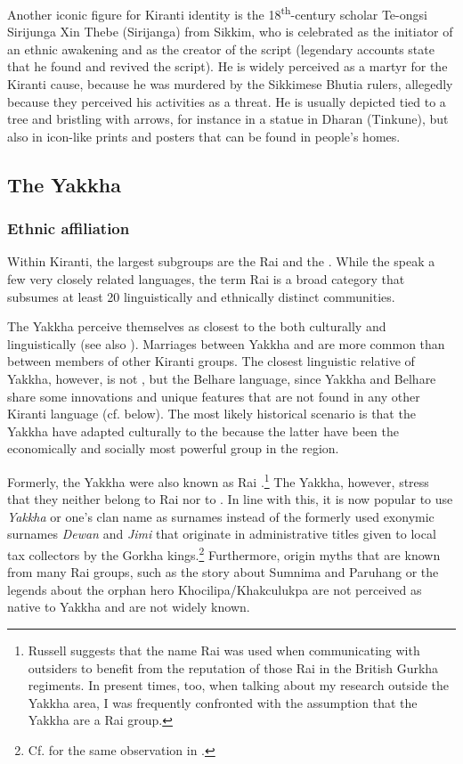 \largerpage
Another iconic figure for Kiranti identity is the 18\textsuperscript{th}-century  scholar Te-ongsi Sirijunga Xin Thebe (Sirijanga) from Sikkim, who is celebrated as the initiator of an ethnic awakening and as the creator of the  script (legendary accounts state that he found and revived the script). He is widely perceived as a martyr for the Kiranti cause, because he was  murdered by the Sikkimese Bhutia rulers, allegedly because they perceived his activities as a threat. He is usually depicted tied to a tree and bristling with arrows, for instance in a statue in Dharan (Tinkune), but also in icon-like prints and posters that can be found in people's homes.


\subsection{The Yakkha}

\subsubsection{Ethnic affiliation}

Within Kiranti, the largest subgroups are the Rai and the . While the  speak a few very closely related languages, the term Rai is a broad category that subsumes at least 20 linguistically and ethnically distinct communities.  

The Yakkha perceive themselves as closest to the  both culturally and linguistically (see also \citet[90]{Russell1992_Yakha}). Marriages between Yakkha and  are more common than between members of other Kiranti groups. The closest linguistic relative of Yakkha, however, is not , but the Belhare language, since Yakkha and Belhare share some innovations and unique features that are not found in any other Kiranti language (cf.  below). The most likely historical scenario is that the Yakkha have adapted culturally to the  because the latter have been  the economically and socially most powerful group in the region. 

 
Formerly, the Yakkha were also known as Rai \citep[90]{Russell1992_Yakha}.\footnote{Russell suggests that the name Rai was used when communicating with outsiders to benefit from the reputation of those Rai in the British Gurkha regiments. In present times, too, when talking about my research outside the Yakkha area, I was frequently confronted with the assumption that the Yakkha are a Rai group.}  The Yakkha, however, stress that they neither belong to Rai nor to . In line with this, it is now popular to use \emph{Yakkha} or one's  clan name as surnames instead of the formerly used exonymic surnames \emph{Dewan} and \emph{Jimi} that originate in  administrative titles given to local tax collectors by the Gorkha kings.\footnote{Cf. \citet[8]{Doornenbal2009A-grammar} for the same observation in .} Furthermore,  origin myths that are known from many Rai groups, such as the story about Sumnima and Paruhang or the legends about the orphan hero Khocilipa/Khakculukpa \citep{Ebert2003Camling, Gaenszle2000Origins} are not perceived as native to Yakkha and are not widely known. 

